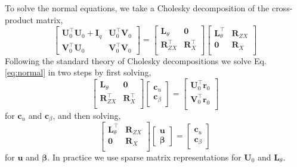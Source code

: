 \documentclass{jss}
\begin{document}
To solve the normal equations, we take a Cholesky decomposition of the
cross-product matrix,
\begin{equation}
\begin{bmatrix}
\bm U_0^\top \bm U_0 + \bm I_q & \bm U_0^\top \bm V_0 \\
\bm V_0^\top \bm U_0 & \bm V_0^\top \bm V_0
\end{bmatrix} =
\begin{bmatrix}
\bm L_\theta & \bm 0 \\
\bm R^\top_{ZX} & \bm R^\top_{X} \\
\end{bmatrix}
\begin{bmatrix}
\bm L^\top_\theta & \bm R_{ZX} \\
\bm 0 & \bm R_{X} \\
\end{bmatrix}
\end{equation}
Following the standard theory of Cholesky decompositions we solve
Eq. \ref{eq:normal} in two steps by first solving,
\begin{equation}
\begin{bmatrix}
\bm L_\theta & \bm 0 \\
\bm R^\top_{ZX} & \bm R^\top_{X} \\
\end{bmatrix}
\begin{bmatrix}
\bm c_u \\
\bm c_\beta
\end{bmatrix} = 
\begin{bmatrix}
\bm U_0^\top \bm r_0 \\
\bm V_0^\top \bm r_0 \\
\end{bmatrix}
\end{equation}
for $\bm c_u$ and $\bm c_\beta$, and then solving,
\begin{equation}
\begin{bmatrix}
\bm L^\top_\theta & \bm R_{ZX} \\
\bm 0 & \bm R_{X} \\
\end{bmatrix}
\begin{bmatrix}
\bm u \\
\bm\beta
\end{bmatrix} = 
\begin{bmatrix}
\bm c_u \\
\bm c_\beta
\end{bmatrix}
\end{equation}
for $\bm u$ and $\bm\beta$. In practice we use sparse matrix
representations for $\bm U_0$ and $\bm L_\theta$.
\end{document}
